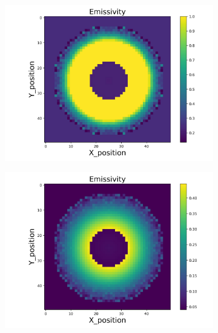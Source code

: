 \begin{figure}[p]
\begin{minipage}{\textwidth}
        \centering
        \begin{subfigure}{0.325\textwidth}
            \centering
            \includegraphics[width=\textwidth]{figures/raw_data/25/lin_square/emi_cal.jpg}
        \end{subfigure}
        \begin{subfigure}{0.325\textwidth}
            \centering
            \includegraphics[width=\textwidth]{figures/raw_data/26/lin_square/emi_cal.jpg}
        \end{subfigure}
        \begin{subfigure}{0.325\textwidth}
            \centering

\end{subfigure}
\end{minipage}
\end{figure}
